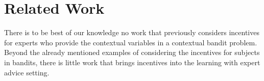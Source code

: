 





\section{Related Work}







There is to be best of our knowledge no work that previously considers incentives for experts who provide the contextual variables in a contextual bandit problem. Beyond the already mentioned examples of considering the incentives for subjects in bandits, there is little work that brings incentives into the learning with expert advice setting. 


